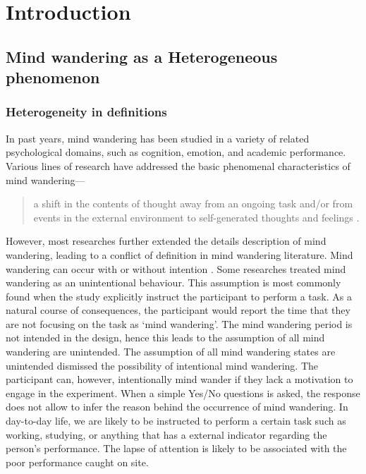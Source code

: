 \chapter{Introduction}
\label{ch:intro}

\newpage


\section{Mind wandering as a Heterogeneous phenomenon}

\subsection{Heterogeneity in definitions}
In past years, mind wandering has been studied in a variety of related psychological domains, such as cognition, emotion, and academic performance. Various lines of research have addressed the basic phenomenal characteristics of mind wandering---
\begin{quote}
    a shift in the contents of thought away from an ongoing task and/or from events in the external environment to self-generated thoughts and feelings \cite{SmallwoodSchooler2006,Smallwood2015}.
\end{quote} 
However, most researches further extended the details description of mind wandering, leading to a conflict of definition in mind wandering literature. Mind wandering can occur with or without intention \cite{Seli2016}. Some researches treated mind wandering as an unintentional behaviour. This assumption is most commonly found when the study explicitly instruct the participant to perform a task. As a natural course of consequences, the participant would report the time that they are not focusing on the task as `mind wandering'. The mind wandering period is not intended in the design, hence this leads to the assumption of all mind wandering are unintended. The assumption of all mind wandering states are unintended dismissed the possibility of intentional mind wandering. The participant can, however, intentionally mind wander if they lack a motivation to engage in the experiment. When a simple Yes/No questions is asked, the response does not allow to infer the reason behind the occurrence of mind wandering. In day-to-day life, we are likely to be instructed to perform a certain task such as working, studying, or anything that has a external indicator regarding the person's performance. The lapse of attention is likely to be associated with the poor performance caught on site.  

